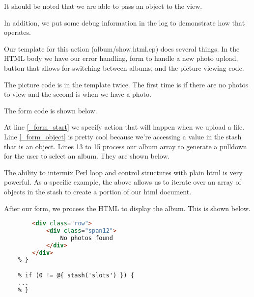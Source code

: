 \documentclass[14pt]{extreport}
\begin{document}
It should be noted that we are able to pass an object to the view.



In addition, we put some debug information in the log to demonstrate how that
operates.



Our template for this action (album/show.html.ep) does several things. In the
HTML body we have our error handling, form to handle a new photo upload, button
that allows for switching between albums, and the picture viewing code.  

The picture code is in the template twice.  The first time is if there are no
photos to view and the second is when we have a photo.

The form code is shown below.



At line \ref{_form_start} we specify action that will happen when we upload a
file.  Line \ref{_form_object} is pretty cool because we're accessing a value in
the stash that is an object.  Lines 13 to 15 process our album array to
generate a pulldown for the user to select an album.  They are shown below.



The ability to intermix Perl loop and control structures with plain html is
very powerful. As a specific example, the above allows us to iterate over an 
array of objects in the stash to create a portion of our html document.

After our form, we process the HTML to display the album.  This is shown below.

\begin{lstlisting}[caption={Display album}, language=Html]
    % if (0 == @{ stash('slots') }) {
        <div class="row">
            <div class="span12">
                No photos found
            </div>
        </div>
    % }

    % if (0 != @{ stash('slots') }) {
    ...
    % }
\end{lstlisting}
\end{document}
